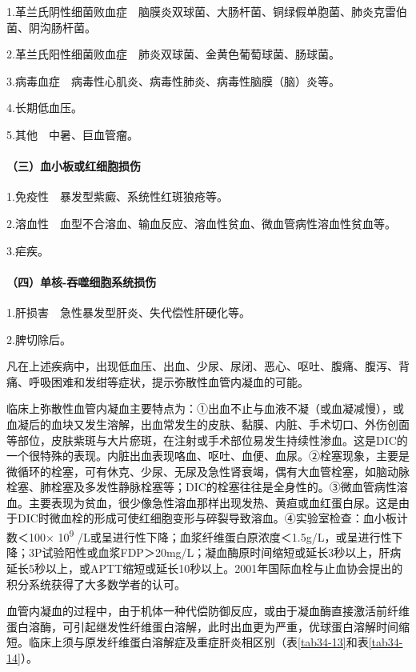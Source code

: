 1.革兰氏阴性细菌败血症　脑膜炎双球菌、大肠杆菌、铜绿假单胞菌、肺炎克雷伯菌、阴沟肠杆菌。

2.革兰氏阳性细菌败血症　肺炎双球菌、金黄色葡萄球菌、肠球菌。

3.病毒血症　病毒性心肌炎、病毒性肺炎、病毒性脑膜（脑）炎等。

4.长期低血压。

5.其他　中暑、巨血管瘤。

\paragraph{（三）血小板或红细胞损伤}

1.免疫性　暴发型紫癜、系统性红斑狼疮等。

2.溶血性　血型不合溶血、输血反应、溶血性贫血、微血管病性溶血性贫血等。

3.疟疾。

\paragraph{（四）单核-吞噬细胞系统损伤}

1.肝损害　急性暴发型肝炎、失代偿性肝硬化等。

2.脾切除后。

凡在上述疾病中，出现低血压、出血、少尿、尿闭、恶心、呕吐、腹痛、腹泻、背痛、呼吸困难和发绀等症状，提示弥散性血管内凝血的可能。

临床上弥散性血管内凝血主要特点为：①出血不止与血液不凝（或血凝减慢），或血凝后的血块又发生溶解，出血常发生的皮肤、黏膜、内脏、手术切口、外伤创面等部位，皮肤紫斑与大片瘀斑，在注射或手术部位易发生持续性渗血。这是DIC的一个很特殊的表现。内脏出血表现咯血、呕吐、血便、血尿。②栓塞现象，主要是微循环的栓塞，可有休克、少尿、无尿及急性肾衰竭，偶有大血管栓塞，如脑动脉栓塞、肺栓塞及多发性静脉栓塞等；DIC的栓塞往往是全身性的。③微血管病性溶血。主要表现为贫血，很少像急性溶血那样出现发热、黄疸或血红蛋白尿。这是由于DIC时微血栓的形成可使红细胞变形与碎裂导致溶血。④实验室检查：血小板计数＜100×
10\textsuperscript{9}
/L或呈进行性下降；血浆纤维蛋白原浓度＜1.5g/L，或呈进行性下降；3P试验阳性或血浆FDP＞20mg/L；凝血酶原时间缩短或延长3秒以上，肝病延长5秒以上，或APTT缩短或延长10秒以上。2001年国际血栓与止血协会提出的积分系统获得了大多数学者的认可。

血管内凝血的过程中，由于机体一种代偿防御反应，或由于凝血酶直接激活前纤维蛋白溶酶，可引起继发性纤维蛋白溶解，此时出血更为严重，优球蛋白溶解时间缩短。临床上须与原发纤维蛋白溶解症及重症肝炎相区别（表\ref{tab34-13}和表\ref{tab34-14}）。

